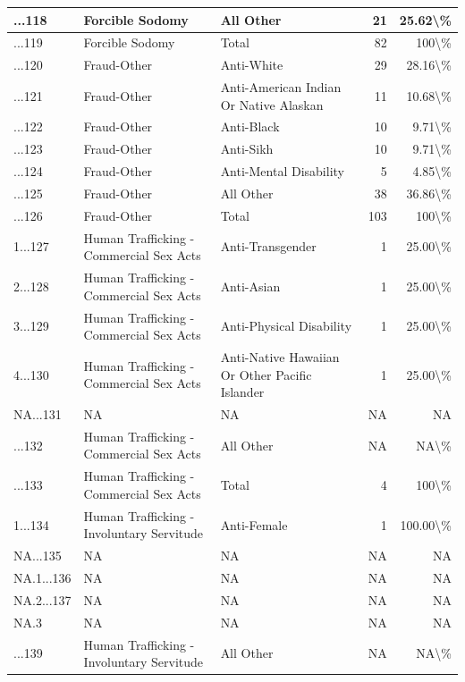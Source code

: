 \documentclass[
]{krantz}
\begin{document}
\begin{longtable}[t]{l|l|l|r|r}
\hline
...118 & Forcible Sodomy & All Other & 21 & 25.62\textbackslash{}\%\\
\hline
...119 & Forcible Sodomy & Total & 82 & 100\textbackslash{}\%\\
\hline
...120 & Fraud-Other & Anti-White & 29 & 28.16\textbackslash{}\%\\
\hline
...121 & Fraud-Other & Anti-American Indian Or Native Alaskan & 11 & 10.68\textbackslash{}\%\\
\hline
...122 & Fraud-Other & Anti-Black & 10 & 9.71\textbackslash{}\%\\
\hline
...123 & Fraud-Other & Anti-Sikh & 10 & 9.71\textbackslash{}\%\\
\hline
...124 & Fraud-Other & Anti-Mental Disability & 5 & 4.85\textbackslash{}\%\\
\hline
...125 & Fraud-Other & All Other & 38 & 36.86\textbackslash{}\%\\
\hline
...126 & Fraud-Other & Total & 103 & 100\textbackslash{}\%\\
\hline
1...127 & Human Trafficking - Commercial Sex Acts & Anti-Transgender & 1 & 25.00\textbackslash{}\%\\
\hline
2...128 & Human Trafficking - Commercial Sex Acts & Anti-Asian & 1 & 25.00\textbackslash{}\%\\
\hline
3...129 & Human Trafficking - Commercial Sex Acts & Anti-Physical Disability & 1 & 25.00\textbackslash{}\%\\
\hline
4...130 & Human Trafficking - Commercial Sex Acts & Anti-Native Hawaiian Or Other Pacific Islander & 1 & 25.00\textbackslash{}\%\\
\hline
NA...131 & NA & NA & NA & NA\\
\hline
...132 & Human Trafficking - Commercial Sex Acts & All Other & NA & NA\textbackslash{}\%\\
\hline
...133 & Human Trafficking - Commercial Sex Acts & Total & 4 & 100\textbackslash{}\%\\
\hline
1...134 & Human Trafficking - Involuntary Servitude & Anti-Female & 1 & 100.00\textbackslash{}\%\\
\hline
NA...135 & NA & NA & NA & NA\\
\hline
NA.1...136 & NA & NA & NA & NA\\
\hline
NA.2...137 & NA & NA & NA & NA\\
\hline
NA.3 & NA & NA & NA & NA\\
\hline
...139 & Human Trafficking - Involuntary Servitude & All Other & NA & NA\textbackslash{}\%\\

\end{longtable}
\end{document}
